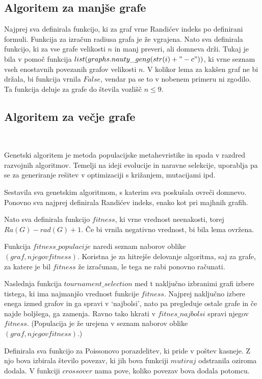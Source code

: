 \documentclass[a4paper, 10pt]{article}
\begin{document}
\subsection{Algoritem za manjše grafe}
Najprej sva definirala funkcijo, ki za graf vrne Randićev indeks po definirani formuli. Funkcija za izračun radiusa grafa je že vgrajena.
Nato sva definirala funkcijo, ki za vse grafe velikosti $n$ in manj preveri, ali domneva drži. Tukaj je bila v pomoč funkcija $list(graphs.nauty\_geng(str(i)+" -c"))$, ki vrne seznam vseh enostavnih povezanih grafov velikosti $n$.
V kolikor lema za kakšen graf ne bi držala, bi funkcija vrnila $False$, vendar pa se to v nobenem primeru ni zgodilo. Ta funkcija deluje za grafe do števila vozlišč $n \leq 9$.

\subsection{Algoritem za večje grafe}
\

Genetski algoritem je metoda populacijske metahevristike in spada v razdred razvojnih algoritmov. Temelji na ideji evolucije in naravne selekcije, uporablja pa se za generiranje rešitev v optimizaciji s križanjem, mutacijami ipd.

Sestavila sva genetskim algoritmom, s katerim sva poskušala ovreči domnevo.
Ponovno sva najprej definirala Randićev indeks, enako kot pri majhnih grafih.

Nato sva definirala funkcijo $fitness$, ki vrne vrednost neenakosti, torej $Ra(G)-rad(G)+1$. Če bi vrnila negativno vrednost, bi bila lema ovržena.

Funkcija $fitness\_populacije$ naredi seznam naborov oblike $(graf, njegov fitness)$. Koristna je za hitrejše delovanje algoritma, saj za grafe, za katere je bil $fitness$ že izračunan, le tega ne rabi ponovno računati.

Naslednja funkcija $tournament\_selection$  med t naključno izbranimi grafi izbere tistega, ki ima najmanjšo vrednost funkcije $fitness$. Najprej naključno izbere enega izmed grafov in ga spravi v `najbolsi', nato pa pregleduje ostale grafe in če najde boljšega, ga zamenja. Ravno tako hkrati v $fitnes\_najbolsi$ spravi njegov $fitness$.
(Populacija je že urejena v seznam naborov oblike $(graf, njegov fitness)$.)

Definirala sva funkcijo za Poissonovo porazdelitev, ki pride v poštev kasneje. Z njo bova izbirala število povezav, ki jih bova funkciji $mutiraj$ odstranila oziroma dodala. V funkciji $crossover$ nama pove, koliko povezav bova dodala potomcu.
\end{document}
